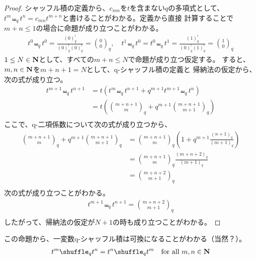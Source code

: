 {	\begin{proof} %
		シャッフル積の定義から、$c_{mn}$を$t$を含まない$q$の多項式として、
		$t^m\shuffle_qt^n=c_{mn}t^{m+n}$と書けることがわかる。定義から直接
		計算することで$m+n\le1$の場合に命題が成り立つことがわかる。
		\begin{align*}
			t^0\shuffle_qt^0 = \frac{(0)_q^!}{(0)_q^!(0)_q^!} 
			= \binom{0}{0}_q,\quad
			t^1\shuffle_qt^0 = t^0\shuffle_qt^1
			= \frac{(1)_q^!}{(0)_q^!(1)_q^!} = \binom{1}{0}_q
		\end{align*}
		$1\le N\in\mathbf{N}$として、すべての$m+n\le N$で命題が成り立つ仮定する。
		すると、$m,n\in\mathbf{N}$を$m+n+1=N$として、q-シャッフル積の定義と
		帰納法の仮定から、次の式が成り立つ。
		\begin{equation*}\begin{split}
			t^{m+1}\shuffle_qt^{n+1} 
			&= t(t^m\shuffle_qt^{n+1} + q^{m+1}t^{m+1}\shuffle_qt^n) \\
			&= t\left(\binom{m+n+1}{m}_q + q^{m+1}\binom{m+n+1}{m+1}_q\right) \\
		\end{split}\end{equation*}
		ここで、q-二項係数について次の式が成り立つから、
		\begin{equation*}\begin{split}
			\binom{m+n+1}{m}_q + q^{m+1}\binom{m+n+1}{m+1}_q
			&= \binom{m+n+1}{m}_q
				\left(1 + q^{m+1}\frac{(n+1)_q}{(m+1)_q}\right) \\
			&= \binom{m+n+1}{m}_q\frac{(m+n+2)_q}{(m+1)_q} \\
			&= \binom{m+n+2}{m+1}_q \\
		\end{split}\end{equation*}
		次の式が成り立つことがわかる。
		\begin{equation*}\begin{split}
			t^{m+1}\shuffle_qt^{n+1} = \binom{m+n+2}{m+1}_q \\
		\end{split}\end{equation*}
		したがって、帰納法の仮定が$N+1$の時も成り立つことがわかる。
	\end{proof} %
	この命題から、一変数q-シャッフル積は可換になることがわかる（当然？）。
	\begin{equation*}\begin{split}
		t^m\shuffle_qt^n = t^n\shuffle_qt^m \quad\text{for all } m,n\in\sizen
	\end{split}\end{equation*}

}
